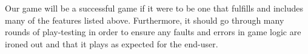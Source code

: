 Our game will be a successful game if it were to be one that fulfills
and includes many of the features listed above.
\newline
Furthermore, it should go through many rounds of play-testing
in order to ensure any faults and errors in game logic are ironed out
and that it plays as expected for the end-user.
